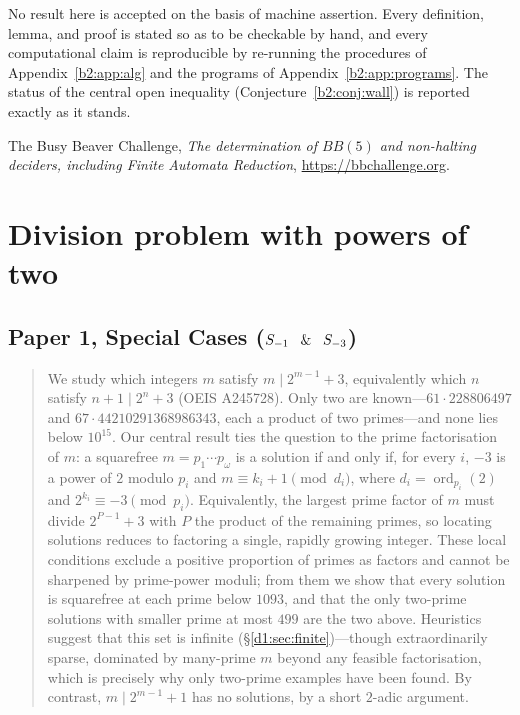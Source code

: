 \documentclass[a4paper]{article}
\theoremstyle{plain}
\theoremstyle{definition}
\theoremstyle{remark}
\newcommand{\ord}{\operatorname{ord}}
\begin{document}
No result here is accepted on the basis of machine assertion. Every definition, lemma, and proof is stated so as to be checkable by hand, and every computational claim is reproducible by re-running the procedures of Appendix~\ref{b2:app:alg} and the programs of Appendix~\ref{b2:app:programs}. The status of the central open inequality (Conjecture~\ref{b2:conj:wall}) is reported exactly as it stands.

\begin{thebibliography}{9}
 The Busy Beaver Challenge, \emph{The determination of $BB(5)$ and non-halting deciders, including Finite Automata Reduction}, \url{https://bbchallenge.org}.
\end{thebibliography}


\section{Division problem with powers of two}

\subsection{Paper 1, Special Cases ($S_{-1} \; \And \; S_{-3}$)}

\begin{abstract}
We study which integers $m$ satisfy $m\mid 2^{m-1}+3$, equivalently which $n$ satisfy
$n+1\mid 2^{n}+3$ (OEIS A245728). Only two are known---$61\cdot 228806497$ and
$67\cdot 44210291368986343$, each a product of two primes---and none lies below $10^{15}$. Our
central result ties the question to the prime factorisation of $m$: a squarefree
$m=p_{1}\cdots p_{\omega}$ is a solution if and only if, for every $i$, $-3$ is a power of $2$
modulo $p_{i}$ and $m\equiv k_{i}+1\pmod{d_{i}}$, where $d_{i}=\ord_{p_{i}}(2)$ and
$2^{k_{i}}\equiv-3\pmod{p_{i}}$. Equivalently, the largest prime factor of $m$ must divide
$2^{P-1}+3$ with $P$ the product of the remaining primes, so locating solutions reduces to
factoring a single, rapidly growing integer. These local conditions exclude a positive
proportion of primes as factors and cannot be sharpened by prime-power moduli; from them we show
that every solution is squarefree at each prime below $1093$, and that the only two-prime
solutions with smaller prime at most $499$ are the two above. Heuristics suggest that this set is infinite (\S\ref{d1:sec:finite})---though extraordinarily
sparse, dominated by many-prime $m$ beyond any feasible factorisation, which is precisely why
only two-prime examples have been found. By contrast, $m\mid 2^{m-1}+1$ has no solutions, by a
short $2$-adic argument.
\end{abstract}
\end{document}
